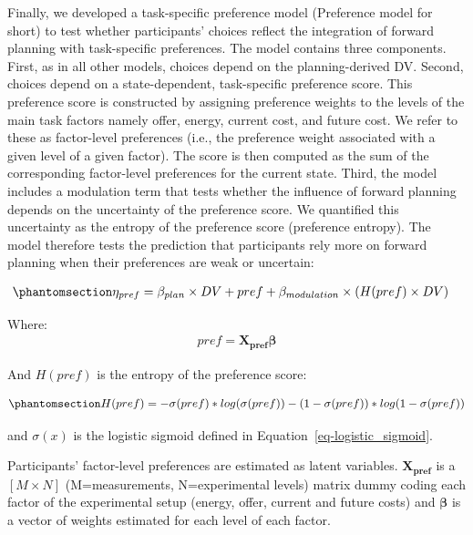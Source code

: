 \documentclass[
  letterpaper,
  DIV=11,
  numbers=noendperiod]{scrartcl}
\begin{document}
Finally, we developed a task-specific preference model (Preference model
for short) to test whether participants' choices reflect the integration
of forward planning with task-specific preferences. The model contains
three components. First, as in all other models, choices depend on the
planning-derived DV. Second, choices depend on a state-dependent,
task-specific preference score. This preference score is constructed by
assigning preference weights to the levels of the main task factors
namely offer, energy, current cost, and future cost. We refer to these
as factor-level preferences (i.e., the preference weight associated with
a given level of a given factor). The score is then computed as the sum
of the corresponding factor-level preferences for the current state.
Third, the model includes a modulation term that tests whether the
influence of forward planning depends on the uncertainty of the
preference score. We quantified this uncertainty as the entropy of the
preference score (preference entropy). The model therefore tests the
prediction that participants rely more on forward planning when their
preferences are weak or uncertain:

\begin{equation}\protect\phantomsection\label{eq-preference_model}{
\begin{aligned}
\eta_{pref} &= \beta_{plan} \times DV + pref + \beta_{modulation} \times(H(pref) \times DV)
\end{aligned}
}\end{equation}

Where: \[
\begin{aligned}
pref = \mathbf{X_{pref}}\mathbf{\beta}
\end{aligned}
\]

And \(H(pref)\) is the entropy of the preference score:

\begin{equation}\protect\phantomsection\label{eq-entropy}{
\begin{aligned}
H(pref) = -\sigma(pref) * log(\sigma(pref)) - (1-\sigma(pref)) * log(1-\sigma(pref))
\end{aligned}
}\end{equation}

and \(\sigma(x)\) is the logistic sigmoid defined in
Equation~\ref{eq-logistic_sigmoid}.

Participants' factor-level preferences are estimated as latent
variables. \(\mathbf{X_{pref}}\) is a \([M \times N]\) (M=measurements,
N=experimental levels) matrix dummy coding each factor of the
experimental setup (energy, offer, current and future costs) and
\(\mathbf{\beta}\) is a vector of weights estimated for each level of
each factor.
\end{document}
